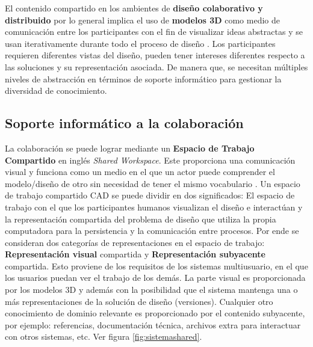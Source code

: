 El contenido compartido en los ambientes de \textbf{diseño colaborativo y distribuido} por lo general implica el uso de \textbf{modelos 3D} como medio de comunicación entre los participantes con el fin de visualizar ideas abstractas y se usan iterativamente durante todo el proceso de diseño \citep{Tek-JinNam2009}. Los participantes requieren diferentes vistas del diseño, pueden tener intereses diferentes respecto %
a las soluciones y su representación asociada. De manera que, se necesitan múltiples niveles de abstracción en términos de soporte informático para gestionar la diversidad de conocimiento. %


\subsection{Soporte informático a la colaboración }
La colaboración se puede lograr mediante un \textbf{Espacio de Trabajo Compartido} en inglés \textit{Shared Workspace}. 
Este proporciona una comunicación visual y funciona como un medio en el que un actor puede comprender el modelo/diseño de otro sin necesidad de tener el mismo vocabulario \citep{Maher2006}.
Un espacio de trabajo compartido CAD se puede dividir en dos significados: El espacio de trabajo con el que los participantes humanos visualizan el diseño e interactúan y la representación compartida del problema de diseño que utiliza la propia computadora para la persistencia y la comunicación entre procesos. Por ende se consideran dos categorías de representaciones en el espacio de trabajo: \textbf{{Representación visual}} compartida y \textbf{Representación subyacente} compartida. Esto proviene de los requisitos de los sistemas multiusuario, en el que los usuarios puedan ver el trabajo de los demás. La parte visual es proporcionada por los modelos 3D y además con la posibilidad que el sistema mantenga una o más representaciones de la solución de diseño (versiones). Cualquier otro conocimiento de dominio relevante es proporcionado por el contenido subyacente, por ejemplo: referencias, documentación técnica, archivos extra para interactuar con otros sistemas, etc. Ver figura \ref{fig:sistemashared}.

